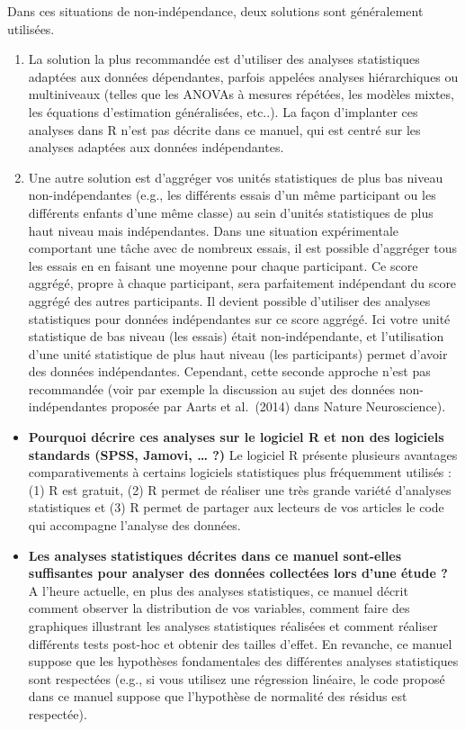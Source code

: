 \documentclass[
]{book}
\begin{document}
Dans ces situations de non-indépendance, deux solutions sont généralement utilisées.

\begin{enumerate}
\def\labelenumi{\arabic{enumi})}
\item
  La solution la plus recommandée est d'utiliser des analyses statistiques adaptées aux données dépendantes, parfois appelées analyses hiérarchiques ou multiniveaux (telles que les ANOVAs à mesures répétées, les modèles mixtes, les équations d'estimation généralisées, etc..). La façon d'implanter ces analyses dans R n'est pas décrite dans ce manuel, qui est centré sur les analyses adaptées aux données indépendantes. 
\item
  Une autre solution est d'aggréger vos unités statistiques de plus bas niveau non-indépendantes (e.g., les différents essais d'un même participant ou les différents enfants d'une même classe) au sein d'unités statistiques de plus haut niveau mais indépendantes. Dans une situation expérimentale comportant une tâche avec de nombreux essais, il est possible d'aggréger tous les essais en en faisant une moyenne pour chaque participant. Ce score aggrégé, propre à chaque participant, sera parfaitement indépendant du score aggrégé des autres participants. Il devient possible d'utiliser des analyses statistiques pour données indépendantes sur ce score aggrégé. Ici votre unité statistique de bas niveau (les essais) était non-indépendante, et l'utilisation d'une unité statistique de plus haut niveau (les participants) permet d'avoir des données indépendantes. Cependant, cette seconde approche n'est pas recommandée (voir par exemple la discussion au sujet des données non-indépendantes proposée par Aarts et al.~(2014) dans Nature Neuroscience).
\end{enumerate}

\begin{itemize}
\item
  \textbf{Pourquoi décrire ces analyses sur le logiciel R et non des logiciels standards (SPSS, Jamovi, \ldots{} ?)}
  Le logiciel R présente plusieurs avantages comparativements à certains logiciels statistiques plus fréquemment utilisés : (1) R est gratuit, (2) R permet de réaliser une très grande variété d'analyses statistiques et (3) R permet de partager aux lecteurs de vos articles le code qui accompagne l'analyse des données.
\item
  \textbf{Les analyses statistiques décrites dans ce manuel sont-elles suffisantes pour analyser des données collectées lors d'une étude ?}
  A l'heure actuelle, en plus des analyses statistiques, ce manuel décrit comment observer la distribution de vos variables, comment faire des graphiques illustrant les analyses statistiques réalisées et comment réaliser différents tests post-hoc et obtenir des tailles d'effet.
  En revanche, ce manuel suppose que les hypothèses fondamentales des différentes analyses statistiques sont respectées (e.g., si vous utilisez une régression linéaire, le code proposé dans ce manuel suppose que l'hypothèse de normalité des résidus est respectée).
\end{itemize}
\end{document}

